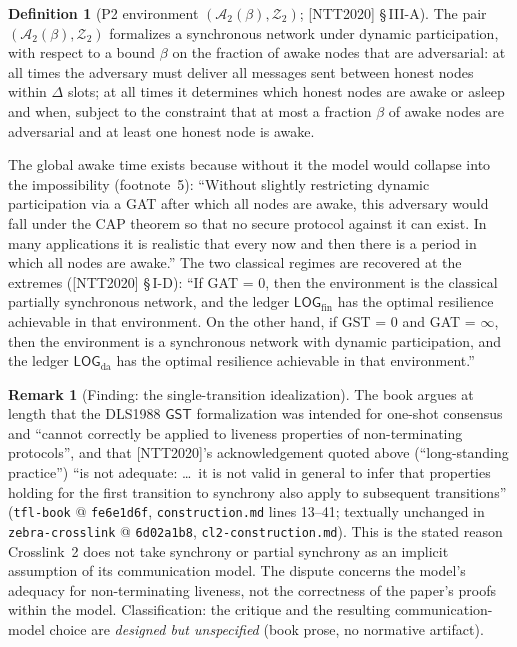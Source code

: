 \documentclass[11pt,a4paper]{article}
\theoremstyle{definition}
\newtheorem{definition}[theorem]{Definition}
\newtheorem{remark}[theorem]{Remark}
\begin{document}
\begin{definition}[P2 environment $(\mathcal{A}_2(\beta), \mathcal{Z}_2)$;
{[NTT2020]} \S\,III-A]\label{def:xl-env-p2}
The pair $(\mathcal{A}_2(\beta), \mathcal{Z}_2)$ formalizes a synchronous
network under dynamic participation, with respect to a bound $\beta$ on
the fraction of awake nodes that are adversarial: at all times the
adversary must deliver all messages sent between honest nodes within
$\Delta$ slots; at all times it determines which honest nodes are awake or
asleep and when, subject to the constraint that at most a fraction $\beta$
of awake nodes are adversarial and at least one honest node is awake.
\end{definition}

The global awake time exists because without it the model would collapse
into the impossibility (footnote~5): ``Without slightly restricting
dynamic participation via a GAT after which all nodes are awake, this
adversary would fall under the CAP theorem so that no secure protocol
against it can exist. In many applications it is realistic that every now
and then there is a period in which all nodes are awake.'' The two
classical regimes are recovered at the extremes ([NTT2020] \S\,I-D): ``If
GAT = 0, then the environment is the classical partially synchronous
network, and the ledger $\mathsf{LOG}_{\mathrm{fin}}$ has the optimal
resilience achievable in that environment. On the other hand, if GST = 0
and GAT = $\infty$, then the environment is a synchronous network with
dynamic participation, and the ledger $\mathsf{LOG}_{\mathrm{da}}$ has the
optimal resilience achievable in that environment.''

\begin{remark}[Finding: the single-transition idealization]
\label{rem:xl-gst-critique}
The book argues at length that the DLS1988 $\mathsf{GST}$ formalization
was intended for one-shot consensus and ``cannot correctly be applied to
liveness properties of non-terminating protocols'', and that [NTT2020]'s
acknowledgement quoted above (``long-standing practice'') ``is not
adequate: \dots\ it is not valid in general to infer that properties
holding for the first transition to synchrony also apply to subsequent
transitions'' (\texttt{tfl-book} @ \texttt{fe6e1d6f},
\texttt{construction.md} lines 13--41; textually unchanged in
\texttt{zebra-crosslink} @ \texttt{6d02a1b8},
\texttt{cl2-construction.md}). This is the stated reason Crosslink~2 does
not take synchrony or partial synchrony as an implicit assumption of its
communication model. The dispute concerns the model's adequacy for
non-terminating liveness, not the correctness of the paper's proofs
within the model. Classification: the critique and the resulting
communication-model choice are \emph{designed but unspecified} (book
prose, no normative artifact).
\end{remark}
\end{document}
